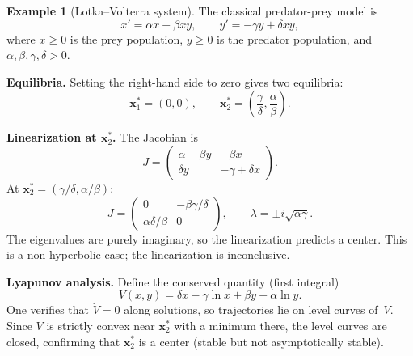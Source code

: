 \documentclass[12pt,a4paper,openany]{book}
\theoremstyle{definition}
\newtheorem{example}[definition]{Example}
\theoremstyle{plain}
\theoremstyle{remark}
\begin{document}
\begin{example}[Lotka--Volterra system]
\label{ex:lotka-volterra}
The classical predator-prey model is
\begin{equation}\label{eq:lotka-volterra}
  x' = \alpha x - \beta xy, \qquad y' = -\gamma y + \delta xy,
\end{equation}
where \(x\ge 0\) is the prey population, \(y\ge 0\) is the predator population,
and \(\alpha,\beta,\gamma,\delta>0\).

\medskip\noindent\textbf{Equilibria.}
Setting the right-hand side to zero gives two equilibria:
\[
  \mathbf{x}_1^* = (0,0), \qquad
  \mathbf{x}_2^* = \left(\frac{\gamma}{\delta},\frac{\alpha}{\beta}\right).
\]

\medskip\noindent\textbf{Linearization at \(\mathbf{x}_2^*\).}
The Jacobian is
\[
  J = \begin{pmatrix} \alpha-\beta y & -\beta x \\
                       \delta y & -\gamma+\delta x \end{pmatrix}.
\]
At \(\mathbf{x}_2^*=(\gamma/\delta,\alpha/\beta)\):
\[
  J = \begin{pmatrix} 0 & -\beta\gamma/\delta \\
      \alpha\delta/\beta & 0 \end{pmatrix},
  \qquad \lambda = \pm i\sqrt{\alpha\gamma}.
\]
The eigenvalues are purely imaginary, so the linearization predicts a center.
This is a non-hyperbolic case; the linearization is inconclusive.

\medskip\noindent\textbf{Lyapunov analysis.}
Define the conserved quantity (first integral)
\begin{equation}\label{eq:lv-conserved}
  V(x,y) = \delta x - \gamma\ln x + \beta y - \alpha\ln y.
\end{equation}
One verifies that \(\dot{V}=0\) along solutions, so trajectories lie on level
curves of~\(V\). Since \(V\) is strictly convex near \(\mathbf{x}_2^*\) with a
minimum there, the level curves are closed, confirming that \(\mathbf{x}_2^*\)
is a center (stable but not asymptotically stable).
\end{example}
\end{document}
